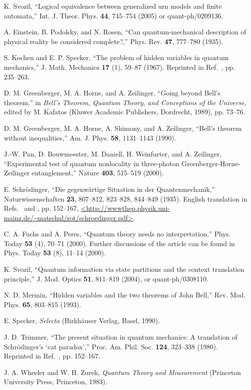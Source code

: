 \documentclass[prb,amssymb,preprint]{revtex4}
\begin{document}
\begin{thebibliography}{10}
K. Svozil, ``Logical equivalence between generalized urn models and
finite automata,'' Int. J. Theor. Phys. \textbf{44},
745--754 (2005) or quant-ph/0209136.

A. Einstein, B. Podolsky, and N. Rosen, ``Can quantum-mechanical
description of physical reality be considered complete?,'' Phys. Rev.
\textbf{47}, 777--780 (1935).

S. Kochen and E. P. Specker, ``The problem of hidden variables in
quantum mechanics,'' J. Math. Mechanics \textbf{17} (1),
59--87 (1967). Reprinted in Ref.~, pp. 235--263.

D. M. Greenberger, M. A. Horne, and A. Zeilinger, ``Going beyond Bell's
theorem,'' in \emph{Bell's Theorem, Quantum Theory, and Conceptions of the
{U}niverse}, edited by M. Kafatos (Kluwer Academic
Publishers,
Dordrecht, 1989), pp. 73--76.

D. M. Greenberger, M. A. Horne, A. Shimony, and A. Zeilinger,
``Bell's
theorem without inequalities,'' Am. J. Phys. \textbf{58},
1131--1143 (1990).

J.-W. Pan, D. Bouwmeester, M. Daniell, H. Weinfurter, and A. Zeilinger,
``Experimental test of quantum nonlocality in three-photon
Greenberger-Horne-Zeilinger entanglement,'' Nature \textbf{403},
515--519 (2000).



E. Schr{\"{o}}dinger, ``Die gegenw{\"{a}}rtige {S}ituation in der
{Q}uantenmechanik,'' Naturwissenschaften \textbf{23}, 807--812, 823--828,
844--849 (1935). English translation in Refs.~ and
, pp.
152--167,
\urlprefix\url{<http://wwwthep.physik.uni-mainz.de/~matschul/rot/schroedinger.pdf>}.

C. A. Fuchs and A. Peres, ``Quantum theory needs no interpretation,''
Phys. Today \textbf{53} (4), 70--71 (2000). Further discussions of the
article can be found in Phys.
Today {\bf 53} (8), 11--14 (2000).

K. Svozil, ``Quantum information via state partitions and the context
translation principle,'' J. Mod. Optics \textbf{51}, 811--819
(2004), or quant-ph/0308110.

N. D. Mermin, ``Hidden variables and the two theorems of {J}ohn
{B}ell,''
Rev. Mod. Phys. \textbf{65}, 803--815 (1993).

E. Specker, \emph{Selecta} (Birkh{\"{a}}user Verlag, Basel, 1990).

 J. D. Trimmer, ``The present situation in quantum
mechanics: A translation of {S}chr{\"{o}}dinger's `cat paradox','' Proc. Am.
Phil. Soc.
\textbf{124}, 323--338 (1980). Reprinted in
Ref.~, pp.
152--167.

J. A. Wheeler and W. H. Zurek, \emph{Quantum Theory and Measurement}
(Princeton
University Press, Princeton, 1983).

\end{thebibliography}
\end{document}
